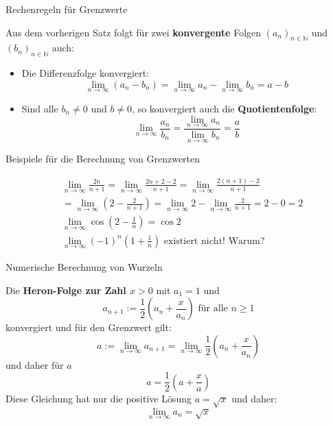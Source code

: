 \begin{frame}{Rechenregeln für Grenzwerte}
	\begin{bemerkung}
		Aus dem vorherigen Satz folgt für zwei \textbf{konvergente} Folgen $(a_{n})_{n \in \mathbb{N}}$ und $(b_{n})_{n \in \mathbb{N}}$ auch:
		\begin{itemize}
			\item Die Differenzfolge konvergiert:
			\[
			\lim_{n \to \infty} (a_{n} - b_{n}) = \lim_{n \to \infty} a_{n} - \lim_{n \to \infty} b_{n} = a - b
			\]
			\item Sind alle $b_{n} \neq 0$ und $b \neq 0$, so konvergiert auch die \textbf{Quotientenfolge}:
			\[
			\lim_{n \to \infty} \frac{a_{n}}{b_{n}} = \frac{\lim_{n \to \infty} a_{n}}{\lim_{n \to \infty} b_{n}} = \frac{a}{b}
			\]
%						
		\end{itemize}
	\end{bemerkung}
\end{frame}

\begin{frame}{Beispiele für die Berechnung von Grenzwerten}
	\begin{example}
	\begin{align*}
		& \lim_{n \to \infty} \frac{2n}{n+1} = \lim_{n \to \infty} \frac{2n+2 - 2}{n+1}  = \lim_{n \to \infty} \frac{2(n+1) - 2}{n+1} \\ & = \lim_{n \to \infty} \left( 2 - \frac{2}{n+1} \right) = \lim_{n \to \infty} 2 - \lim_{n \to \infty} \frac{2}{n+1}  = 2 - 0   = 2 \\
		& \lim_{n \to \infty} \cos \left( 2- \frac{1}{n} \right)  = \cos 2 \\
		& \lim_{n \to \infty} (-1)^{n} \left( 1 + \frac{1}{n}  \right) \mbox{ existiert nicht! Warum?}
	\end{align*}
	\end{example}
\end{frame}

\begin{frame}{Numerische Berechnung von Wurzeln}
	\begin{theorem}
		Die \textbf{Heron-Folge zur Zahl $x>0$} mit $a_{1} = 1$ und
		\[
		a_{n+1} := \frac{1}{2} \left( a_{n} + \frac{x}{a_{n}} \right) \mbox{ für alle } n \geq 1 		
		\]
		konvergiert und für den Grenzwert gilt:
		\[
			a := \lim_{n \to \infty} a_{n+1} = \lim_{n \to \infty} \frac{1}{2} \left( a_{n} + \frac{x}{a_{n}} \right)
		\]
		und daher für $a$ 
		\[
			a = \frac{1}{2} \left( a + \frac{x}{a} \right)
		\]
		Diese Gleichung hat nur die positive Lösung $a=\sqrt{x}$ und daher:
		\[
			\lim_{n \to \infty} a_{n} = \sqrt{x}
		\]
	\end{theorem}
\end{frame}

